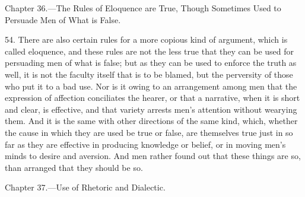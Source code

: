 
Chapter 36.—The Rules of Eloquence are True, Though Sometimes Used to Persuade Men of What is False.

54. There are also certain rules for a more copious kind of argument, which is called eloquence, and these rules are not the less true that they can be used for persuading men of what is false; but as they can be used to enforce the truth as well, it is not the faculty itself that is to be blamed, but the perversity of those who put it to a bad use. Nor is it owing to an arrangement among men that the expression of affection conciliates the hearer, or that a narrative, when it is short and clear, is effective, and that variety arrests men’s attention without wearying them. And it is the same with other directions of the same kind, which, whether the cause in which they are used be true or false, are themselves true just in so far as they are effective in producing knowledge or belief, or in moving men’s minds to desire and aversion. And men rather found out that these things are so, than arranged that they should be so.


Chapter 37.—Use of Rhetoric and Dialectic.

